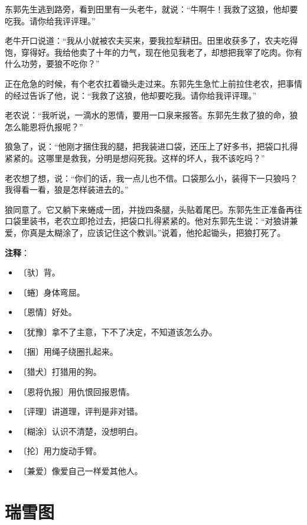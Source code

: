 \documentclass[12pt,UTF-8,openany]{ctexbook}
\begin{document}
\begin{large}
    东郭先生逃到路旁，看到田里有一头老牛，就说：“牛啊牛！我救了这狼，他却要吃我。请你给我评评理。”
    
    老牛开口说道：“我从小就被农夫买来，要我拉犁耕田。田里收获多了，农夫吃得饱，穿得好。我给他卖了十年的力气，现在他见我老了，却想把我宰了吃肉。你有什么功劳，要狼不吃你？”
    
    正在危急的时候，有个老农扛着锄头走过来。东郭先生急忙上前拉住老农，把事情的经过告诉了他，说：“我救了这狼，他却要吃我。请你给我评评理。”
    
    老农说：“我听说，一滴水的恩情，要用一口泉来报答。东郭先生救了狼的命，狼怎么能恩将仇报呢？”
    
    狼急了，说：“他刚才捆住我的腿，把我装进口袋，还压上了好多书，把袋口扎得紧紧的。这哪里是救我，分明是想闷死我。这样的坏人，我不该吃吗？”
    
    老农想了想，说：“你们的话，我一点儿也不信。口袋那么小，装得下一只狼吗？我得看一看，狼是怎样装进去的。”
    
    狼同意了。它又躺下来蜷成一团，并拢四条腿，头贴着尾巴。东郭先生正准备再往口袋里装书，老农立即抢过去，把袋口扎得紧紧的。他对东郭先生说：“对狼讲兼爱，你真是太糊涂了，应该记住这个教训。”说着，他抡起锄头，把狼打死了。
    
\end{large}


\newpage

\textbf{注释}：

\vspace{-1em}

\begin{itemize}
    \setlength\itemsep{-0.2em}
    \item 〔驮〕背。
    \item 〔蜷〕身体弯屈。
    \item 〔恩情〕好处。
    \item 〔犹豫〕拿不了主意，下不了决定，不知道该怎么办。
    \item 〔捆〕用绳子绕圈扎起来。
    \item 〔猎犬〕打猎用的狗。
    \item 〔恩将仇报〕用仇恨回报恩情。
    \item 〔评理〕讲道理，评判是非对错。
    \item 〔糊涂〕认识不清楚，没想明白。
    \item 〔抡〕用力旋动手臂。
    \item 〔兼爱〕像爱自己一样爱其他人。
\end{itemize}

\chapter{瑞雪图}
\end{document}
